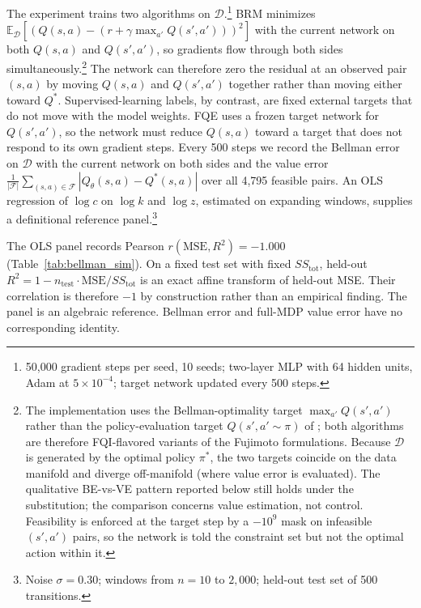 The experiment trains two algorithms on $\mathcal{D}$.\footnote{50,000 gradient steps per seed, 10 seeds; two-layer MLP with 64 hidden units, Adam at $5 \times 10^{-4}$; target network updated every 500 steps.} BRM minimizes $\mathbb{E}_\mathcal{D}[(Q(s,a) - (r + \gamma \max_{a'} Q(s',a')))^2]$ with the current network on both $Q(s,a)$ and $Q(s',a')$, so gradients flow through both sides simultaneously.\footnote{The implementation uses the Bellman-optimality target $\max_{a'} Q(s',a')$ rather than the policy-evaluation target $Q(s', a' \sim \pi)$ of \citet[Section~2]{Fujimoto2022}; both algorithms are therefore FQI-flavored variants of the Fujimoto formulations. Because $\mathcal{D}$ is generated by the optimal policy $\pi^*$, the two targets coincide on the data manifold and diverge off-manifold (where value error is evaluated). The qualitative BE-vs-VE pattern reported below still holds under the substitution; the comparison concerns value estimation, not control. Feasibility is enforced at the target step by a $-10^9$ mask on infeasible $(s',a')$ pairs, so the network is told the constraint set but not the optimal action within it.} The network can therefore zero the residual at an observed pair $(s,a)$ by moving $Q(s,a)$ and $Q(s',a')$ together rather than moving either toward $Q^*$. Supervised-learning labels, by contrast, are fixed external targets that do not move with the model weights. FQE uses a frozen target network for $Q(s',a')$, so the network must reduce $Q(s,a)$ toward a target that does not respond to its own gradient steps. Every 500 steps we record the Bellman error on $\mathcal{D}$ with the current network on both sides and the value error $\frac{1}{|\mathcal{F}|}\sum_{(s,a)\in\mathcal{F}}|Q_\theta(s,a) - Q^*(s,a)|$ over all 4,795 feasible pairs. An OLS regression of $\log c$ on $\log k$ and $\log z$, estimated on expanding windows, supplies a definitional reference panel.\footnote{Noise $\sigma = 0.30$; windows from $n = 10$ to $2{,}000$; held-out test set of 500 transitions.}

The OLS panel records Pearson $r(\mathrm{MSE}, R^2) = -1.000$ (Table~\ref{tab:bellman_sim}). On a fixed test set with fixed $SS_\text{tot}$, held-out $R^2 = 1 - n_\text{test} \cdot \mathrm{MSE}/SS_\text{tot}$ is an exact affine transform of held-out MSE. Their correlation is therefore $-1$ by construction rather than an empirical finding. The panel is an algebraic reference. Bellman error and full-MDP value error have no corresponding identity.

